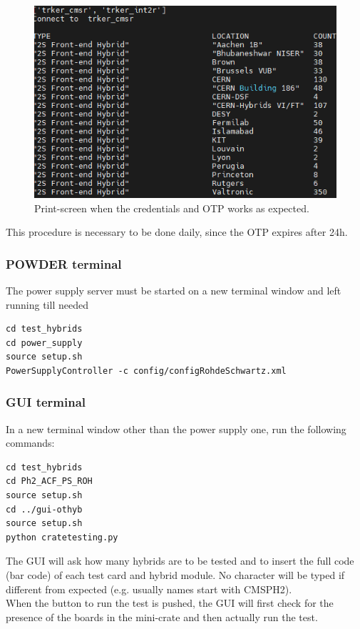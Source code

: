 \documentclass[10pt,a4paper]{article}
\begin{document}
\begin{figure}[h!]
\centering
 \includegraphics[width=0.7\linewidth]{Pictures/otp-success.png} 
  \caption{Print-screen when the credentials and OTP works as expected.}
  \label{OTP}
\end{figure}

This procedure is necessary to be done daily, since the OTP expires after 24h.

\subsubsection{POWDER terminal}

The power supply server must be started on a new terminal window and left running till needed

\begin{framed}
\begin{verbatim}
cd test_hybrids
cd power_supply
source setup.sh
PowerSupplyController -c config/configRohdeSchwartz.xml
\end{verbatim}
\end{framed}

\subsubsection{GUI terminal}

In a new terminal window other than the power supply one, run the following commands:

\begin{framed}
\begin{verbatim}
cd test_hybrids
cd Ph2_ACF_PS_ROH
source setup.sh 
cd ../gui-othyb
source setup.sh 
python cratetesting.py
\end{verbatim}
\end{framed}

The GUI will ask how many hybrids are to be tested and to insert the full code (bar code) of each test card and hybrid module.
No character will be typed if different from expected (e.g. usually names start with CMSPH2). \\
When the button to run the test is pushed, the GUI will first check for the presence of the boards in the mini-crate and then actually run the test. \\
\end{document}

